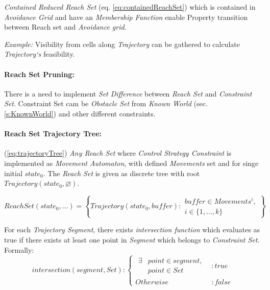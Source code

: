     \begin{note}
        \emph{Contained Reduced Reach Set} (eq. \ref{eq:containedReachSet}) which is contained in \emph{Avoidance Grid} and have an \emph{Membership Function} enable Property transition between Reach set and \emph{Avoidance grid}. 
        
        \emph{Example:} Visibility from cells along \emph{Trajectory} can be gathered to calculate \emph{Trajectory`s} feasibility.
    \end{note}
    
    \paragraph{Reach Set Pruning:} There is a need to implement \emph{Set Difference} between \emph{Reach Set} and 
    \emph{Constraint Set}. Constraint Set cam be \emph{Obstacle Set} from \emph{Known World} (sec. \ref{s:KnownWorld}) and other different constraints.
    
    \paragraph{Reach Set Trajectory Tree:} (\ref{eq:trajectoryTree}) \emph{Any Reach Set} where \emph{Control Strategy Constraint} is implemented as \emph{Movement Automaton}, with defined \emph{Movements} set and for singe initial $state_0$. The \emph{Reach Set} is given as discrete tree with root $Trajectory(state_0,\varnothing)$. 
    
    \begin{equation}\label{eq:trajectoryTree}
        ReachSet(state_0,\dots) = \left\{Trajectory(state_0,buffer):
        \begin{gathered}
            buffer\in Movements^i,\\
            i\in\{1,\dots,k\}
        \end{gathered}\right\}
    \end{equation}
    
    \noindent For each \emph{Trajectory Segment}, there exists \emph{intersection function} which evaluates as true if there exists at least one point in \emph{Segment} which belongs to \emph{Constraint Set}. Formally: 
    \begin{equation}\label{eq:reachsetIntersectionConstraintSet}
        intersection(segment,Set):
        \begin{cases}
            \begin{aligned}\exists &point \in segment,\\ &point \in Set \end{aligned}&: true \\
            Otherwise &: false 
        \end{cases}
    \end{equation}
    
